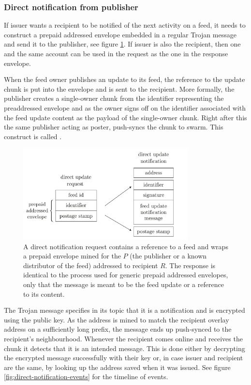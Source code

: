 \subsubsection{Direct notification from publisher}

If issuer wants a recipient to be notified of the next activity on a feed, it needs to construct a prepaid addressed envelope embedded in a regular Trojan message and send it to the publisher, see figure \ref{fig:direct-notification}. If issuer is also the recipient, then one and the same account can be used in the request as the one in the response envelope. 


When the feed owner publishes an update to its feed, the reference to the update chunk is put into the envelope and is sent to the recipient.    More formally, the publisher creates a single-owner chunk from the identifier representing the preaddressed envelope and as the owner signs off on the identifier associated with the feed update content as the payload of the single-owner chunk. Right after this the same publisher acting as poster, push-syncs the chunk to swarm. This construct is called . 

\begin{figure}[htbp]
   \centering
   \includegraphics[width=0.8\textwidth]{fig/direct-notification.pdf}
   \caption[Direct notification request and response \statusgreen]{A direct notification request contains a reference to a feed and wraps a prepaid envelope mined for the $P$ (the publisher or a known distributor of the feed) addressed to recipient $R$. The response is identical to the process used for generic prepaid addressed envelopes, only that the message is meant to be the feed update or a reference to its content.}
   \label{fig:direct-notification}
\end{figure}

The Trojan message specifies in its topic that it is a notification and is encrypted using the public key. As the address is mined to match the recipient overlay address on a sufficiently long prefix, the message ends up push-synced to the recipient's neighbourhood. Whenever the recipient comes online and receives the chunk it detects that it is an intended message. This is done either by decrypting the encrypted message successfully with their key or, in case issuer and recipient are the same, by looking up the address saved when it was issued.  See figure \ref{fig:direct-notification-events} for the timeline of events.


